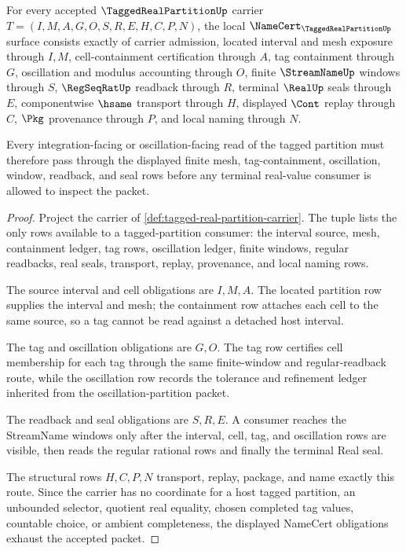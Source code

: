 \begin{theorem}
\label{thm:tagged-real-partition-namecert-obligations}
For every accepted $\TaggedRealPartitionUp$ carrier $T=(I,M,A,G,O,S,R,E,H,C,P,N)$, the local $\NameCert_{\TaggedRealPartitionUp}$ surface consists exactly of carrier admission, located interval and mesh exposure through $I,M$, cell-containment certification through $A$, tag containment through $G$, oscillation and modulus accounting through $O$, finite $\StreamNameUp$ windows through $S$, $\RegSeqRatUp$ readback through $R$, terminal $\RealUp$ seals through $E$, componentwise $\hsame$ transport through $H$, displayed $\Cont$ replay through $C$, $\Pkg$ provenance through $P$, and local naming through $N$.

Every integration-facing or oscillation-facing read of the tagged partition must therefore pass through the displayed finite mesh, tag-containment, oscillation, window, readback, and seal rows before any terminal real-value consumer is allowed to inspect the packet.
\end{theorem}
\begin{proof}
Project the carrier of \autoref{def:tagged-real-partition-carrier}. The tuple lists the only rows available to a tagged-partition consumer: the interval source, mesh, containment ledger, tag rows, oscillation ledger, finite windows, regular readbacks, real seals, transport, replay, provenance, and local naming rows.

The source interval and cell obligations are $I,M,A$. The located partition row supplies the interval and mesh; the containment row attaches each cell to the same source, so a tag cannot be read against a detached host interval.

The tag and oscillation obligations are $G,O$. The tag row certifies cell membership for each tag through the same finite-window and regular-readback route, while the oscillation row records the tolerance and refinement ledger inherited from the oscillation-partition packet.

The readback and seal obligations are $S,R,E$. A consumer reaches the StreamName windows only after the interval, cell, tag, and oscillation rows are visible, then reads the regular rational rows and finally the terminal Real seal.

The structural rows $H,C,P,N$ transport, replay, package, and name exactly this route. Since the carrier has no coordinate for a host tagged partition, an unbounded selector, quotient real equality, chosen completed tag values, countable choice, or ambient completeness, the displayed NameCert obligations exhaust the accepted packet.
\end{proof}

